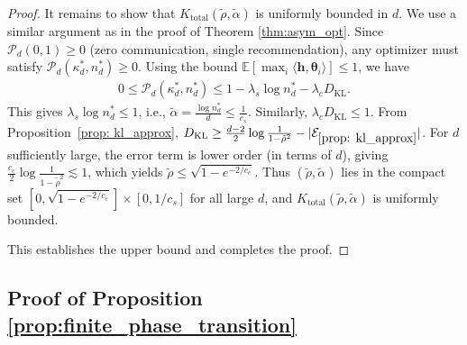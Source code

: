\documentclass[12pt]{article}
\theoremstyle{definition}
\theoremstyle{remark}
\begin{document}
\begin{proof}
It remains to show that $K_{\text{total}}(\tilde{\rho}, \tilde{\alpha})$ is uniformly bounded in $d$. We use a similar argument as in the proof of Theorem \ref{thm:asym_opt}. Since $\mathcal{P}_d(0, 1) \geq 0$ (zero communication, single recommendation), any optimizer must satisfy $\mathcal{P}_d(\kappa^*_d, n^*_d) \geq 0$. Using the bound $\mathbb{E}[\max_i \langle \mathbf{h}, \boldsymbol{\theta}_i \rangle] \leq 1$, we have
\begin{align*}
    0 \leq \mathcal{P}_d(\kappa^*_d, n^*_d) \leq 1 - \lambda_s \log n^*_d - \lambda_c D_{\mathrm{KL}}.
\end{align*}
This gives $\lambda_s \log n^*_d \leq 1$, i.e., $\tilde{\alpha} = \frac{\log n^*_d}{d} \leq \frac{1}{c_s}$. Similarly, $\lambda_c D_{\mathrm{KL}} \leq 1$. From Proposition~\ref{prop: kl_approx}, $D_{\mathrm{KL}} \geq \frac{d-2}{2}\log\frac{1}{1-\tilde{\rho}^2} - |\mathcal{E}_{\ref{prop: kl_approx}}|$. For $d$ sufficiently large, the error term is lower order (in terms of $d$), giving $\frac{c_c}{2}\log\frac{1}{1-\tilde{\rho}^2} \lesssim 1$, which yields $\tilde{\rho} \leq \sqrt{1 - e^{-2/c_c}}$. Thus $(\tilde{\rho}, \tilde{\alpha})$ lies in the compact set $[0, \sqrt{1 - e^{-2/c_c}}] \times [0, 1/c_s]$ for all large $d$, and $K_{\text{total}}(\tilde{\rho}, \tilde{\alpha})$ is uniformly bounded.

This establishes the upper bound and completes the proof.
\end{proof}

\subsection{Proof of Proposition \ref{prop:finite_phase_transition}}
\end{document}
